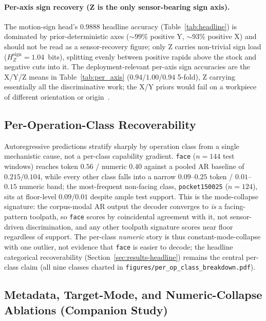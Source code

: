 \documentclass[sensors,article,submit,moreauthors,pdftex]{Definitions/mdpi}
\begin{document}
\paragraph{Per-axis sign recovery (Z is the only sensor-bearing sign axis).} The motion-sign head's $0.9888$ headline accuracy (Table~\ref{tab:headline}) is dominated by prior-deterministic axes ($\sim\!99\%$ positive Y, $\sim\!93\%$ positive X) and should not be read as a sensor-recovery figure; only Z carries non-trivial sign load ($H_{Z}^{\text{sign}}\!=\!1.04$~bits), splitting evenly between positive rapids above the stock and negative cuts into it. The deployment-relevant per-axis sign accuracies are the X/Y/Z means in Table~\ref{tab:per_axis} ($0.94$/$1.00$/$0.94$ 5-fold), Z carrying essentially all the discriminative work; the X/Y priors would fail on a workpiece of different orientation or origin~\cite{paperB_entropy}.

\subsection{Per-Operation-Class Recoverability}
\label{sec:per-op-class}

Autoregressive predictions stratify sharply by operation class from a single mechanistic cause, not a per-class capability gradient. \texttt{face} ($n=144$ test windows) reaches token $0.56$ / numeric $0.40$ against a pooled AR baseline of $0.215 / 0.104$, while every other class falls into a narrow $0.09$--$0.25$ token / $0.01$--$0.15$ numeric band; the most-frequent non-facing class, \texttt{pocket150025} ($n=124$), sits at floor-level $0.09 / 0.01$ despite ample test support. This is the mode-collapse signature: the corpus-modal AR output the decoder converges to \emph{is} a facing-pattern toolpath, so \texttt{face} scores by coincidental agreement with it, not sensor-driven discrimination, and any other toolpath signature scores near floor regardless of support. The per-class \emph{numeric} story is thus constant-mode-collapse with one outlier, not evidence that \texttt{face} is easier to decode; the headline categorical recoverability (Section~\ref{sec:results-headline}) remains the central per-class claim (all nine classes charted in \texttt{figures/per\_op\_class\_breakdown.pdf}).
\subsection{Metadata, Target-Mode, and Numeric-Collapse Ablations (Companion Study)}
\label{sec:results-rq2}
\end{document}
